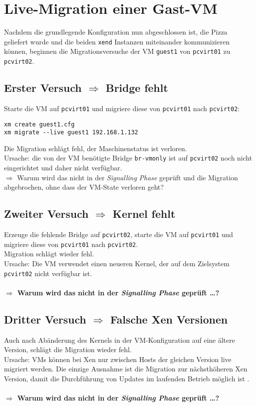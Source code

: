 \section{Live-Migration einer Gast-VM}
\label{mig_vers}
Nachdem die grundlegende Konfiguration nun abgeschlossen ist, die Pizza geliefert wurde und die beiden \verb#xend# Instanzen miteinander kommunizieren können, beginnen die Migrationsversuche der VM \verb#guest1# von \verb#pcvirt01# zu \verb#pcvirt02#.

\subsection{Erster Versuch $\Rightarrow$ Bridge fehlt}
Starte die VM auf \verb#pcvirt01# und migriere diese von \verb#pcvirt01# nach \verb#pcvirt02#:
\setupVerbatimOut
\begin{verbatim}
xm create guest1.cfg
xm migrate --live guest1 192.168.1.132
\end{verbatim}

Die Migration schlägt fehl, der Maschinenstatus ist verloren. 
\\
Ursache: die von der VM benötigte Bridge \verb#br-vmonly# ist auf \verb#pcvirt02# noch nicht eingerichtet und daher nicht verfügbar.
\\
$\Rightarrow$ Warum wird das nicht in der \emph{Signalling Phase} geprüft und die Migration abgebrochen, ohne dass der VM-State verloren geht? 

\subsection {Zweiter Versuch $\Rightarrow$ Kernel fehlt}
Erzeuge die fehlende Bridge auf \verb#pcvirt02#, starte die VM auf \verb#pcvirt01# und migriere diese von \verb#pcvirt01# nach \verb#pcvirt02#.
\\
Migration schlägt wieder fehl.\\ 
Ursache: Die VM verwendet einen neueren Kernel, der auf dem Zielsystem \verb#pcvirt02# nicht verfügbar ist.
\\
\\
\large
\textbf{$\Rightarrow$ Warum wird das nicht in der \emph{Signalling Phase} geprüft \dots?}
\normalsize

\subsection {Dritter Versuch $\Rightarrow$ Falsche Xen Versionen}
Auch nach Abänderung des Kernels in der VM-Konfiguration auf eine ältere Version, schlägt die Migration wieder fehl. 
\\
Ursache: VMs können bei Xen nur zwischen Hosts der gleichen Version live migriert werden. Die einzige Ausnahme ist die Migration zur nächsthöheren Xen Version, damit die Durchführung von Updates im laufenden Betrieb möglich ist \cite{wiki_xen_version}.
\\
\\
\Large
\textbf{$\Rightarrow$ Warum wird das nicht in der \emph{Signalling Phase} geprüft \dots?}
\normalsize

